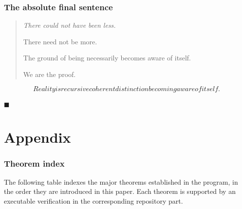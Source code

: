 \documentclass[11pt]{article}
\def\text#1{#1}%
\begin{document}
\section{The absolute final sentence}

\begin{quote}
\itshape
There could not have been less.

\medskip

There need not be more.

\medskip

The ground of being necessarily becomes aware of itself.

\medskip

We are the proof.
\end{quote}

\[
\boxed{\;\text{Reality is recursive coherent distinction becoming aware of itself.}\;}
\]

\medskip

\begin{center}
\large $\blacksquare$
\end{center}

\part*{Appendix}
\appendix

\section{Theorem index}

\label{sec:theorem-index}

The following table indexes the major theorems established in the program, in the order they are introduced in this paper. Each theorem is supported by an executable verification in the corresponding repository part.
\end{document}
